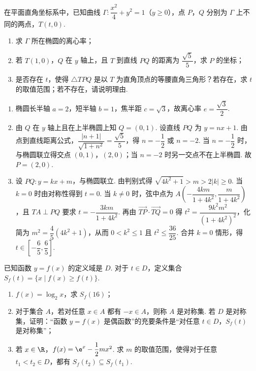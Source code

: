 \documentclass[UTF8,a4paper,oneside,11pt]{ctexbook}
\begin{document}
\begin{problem}
在平面直角坐标系中，已知曲线 \(\Gamma:\dfrac{x^2}{4}+y^2=1\)（\(y\ge0\)），点 \(P\)，\(Q\) 分别为 \(\Gamma\) 上不同的两点，\(T(t,0)\).
\begin{enumerate}
\item 求 \(\Gamma\) 所在椭圆的离心率；
\item 若 \(T(1,0)\)，\(Q\) 在 \(y\) 轴上，且 \(T\) 到直线 \(PQ\) 的距离为 \(\dfrac{\sqrt5}{5}\)，求 \(P\) 的坐标；
\item 是否存在 \(t\)，使得 \(\triangle TPQ\) 是以 \(T\) 为直角顶点的等腰直角三角形？若存在，求 \(t\) 的取值范围；若不存在，请说明理由.
\end{enumerate}

\end{problem}

\begin{solution}
\begin{enumerate}
\item 椭圆长半轴 \(a=2\)，短半轴 \(b=1\)，焦半距 \(c=\sqrt3\)，故离心率 \(e=\dfrac{\sqrt3}{2}\).
\item 由 \(Q\) 在 \(y\) 轴上且在上半椭圆上知 \(Q=(0,1)\). 设直线 \(PQ\) 为 \(y=nx+1\). 由点到直线距离公式，\(\dfrac{|n+1|}{\sqrt{1+n^2}}=\dfrac{\sqrt5}{5}\)，得 \(n=-\dfrac12\) 或 \(n=-2\). 当 \(n=-\dfrac12\) 时，与椭圆联立得交点 \((0,1)\)，\((2,0)\)；当 \(n=-2\) 时另一交点不在上半椭圆. 故 \(P=(2,0)\).
\item 设 \(PQ:y=kx+m\)，与椭圆联立. 由判别式得 \(\sqrt{4k^2+1}>m>2|k|\ge0\). 当 \(k=0\) 时由对称性得到 \(t=0\). 当 \(k\ne0\) 时，弦中点为 \(A\left(-\dfrac{4km}{1+4k^2},\dfrac{m}{1+4k^2}\right)\)，且 \(TA\perp PQ\) 要求 \(t=-\dfrac{3km}{1+4k^2}\). 再由 \(\overrightarrow{TP}\cdot\overrightarrow{TQ}=0\) 得 \(t^2=\dfrac{9k^2m^2}{(1+4k^2)^2}\)，化简为 \(m^2=\dfrac45(4k^2+1)\)，从而 \(0<k^2\le1\) 且 \(t^2\le\dfrac{36}{25}\). 合并 \(k=0\) 情形，得 \(t\in\left[-\dfrac65,\dfrac65\right]\).
\end{enumerate}
\end{solution}

\begin{problem}
已知函数 \(y=f(x)\) 的定义域是 \(D\). 对于 \(t\in D\)，定义集合 \(S_f(t)=\{x\mid f(x)\ge f(t)\}\).
\begin{enumerate}
\item \(f(x)=\log_2x\)，求 \(S_f(16)\)；
\item 对于集合 \(A\)，若对任意 \(x\in A\) 都有 \(-x\in A\)，则称 \(A\) 是对称集. 若 \(D\) 是对称集，证明：“函数 \(y=f(x)\) 是偶函数”的充要条件是“对任意 \(t\in D\)，\(S_f(t)\) 是对称集”；
\item 若 \(x\in\R\)，\(f(x)=\e^x-\dfrac12mx^2\). 求 \(m\) 的取值范围，使得对于任意 \(t_1<t_2\in D\)，都有 \(S_f(t_2)\subseteq S_f(t_1)\).
\end{enumerate}
\end{problem}
\end{document}
